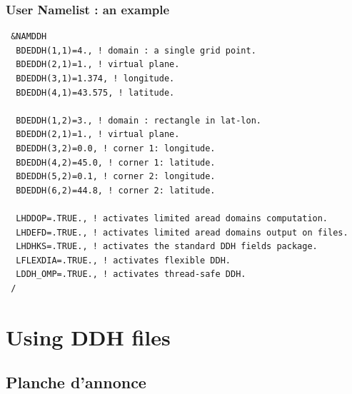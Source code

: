 \documentclass[aspectratio=169]{beamer}
\begin{document}
\begin{frame}[fragile]
\frametitle{{\normalsize User Namelist : an example} }
\vspace*{-0.4cm}
\begin{exampleblock}{}
\begin{footnotesize}
\begin{verbatim} 
 &NAMDDH                                                                                            
  BDEDDH(1,1)=4., ! domain : a single grid point.
  BDEDDH(2,1)=1., ! virtual plane.
  BDEDDH(3,1)=1.374, ! longitude.
  BDEDDH(4,1)=43.575, ! latitude.

  BDEDDH(1,2)=3., ! domain : rectangle in lat-lon.
  BDEDDH(2,1)=1., ! virtual plane.
  BDEDDH(3,2)=0.0, ! corner 1: longitude.
  BDEDDH(4,2)=45.0, ! corner 1: latitude.
  BDEDDH(5,2)=0.1, ! corner 2: longitude.
  BDEDDH(6,2)=44.8, ! corner 2: latitude.

  LHDDOP=.TRUE., ! activates limited aread domains computation.
  LHDEFD=.TRUE., ! activates limited aread domains output on files.
  LHDHKS=.TRUE., ! activates the standard DDH fields package.
  LFLEXDIA=.TRUE., ! activates flexible DDH.
  LDDH_OMP=.TRUE., ! activates thread-safe DDH.
 /
\end{verbatim}  
\end{footnotesize}
\end{exampleblock}
\end{frame}
\section{Using DDH files}

\subsection{Planche d'annonce}
\end{document}
